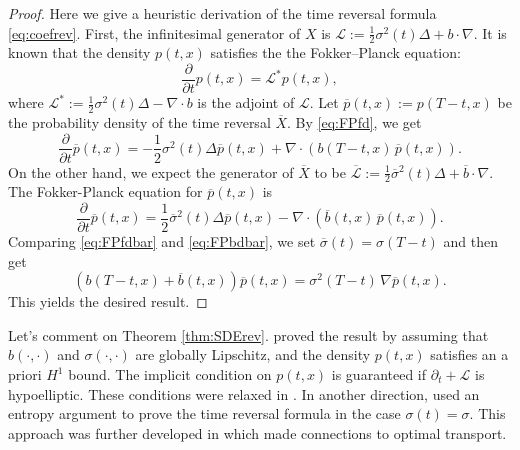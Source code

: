 \documentclass[letterpaper,11pt,reqno]{amsart}
\numberwithin{equation}{section}
\begin{document}
\begin{proof}
Here we give a heuristic derivation of the time reversal formula \eqref{eq:coefrev}.
First, the infinitesimal generator of $X$ is 
$\mathcal{L}:= \frac{1}{2} \sigma^2(t) \Delta  +b \cdot \nabla$.
It is known that the density $p(t,x)$ satisfies the the Fokker–Planck equation:
\begin{equation}
\label{eq:FPfd}
\frac{\partial}{\partial t} p(t,x) = \mathcal{L}^*p(t,x),
\end{equation}
where $\mathcal{L}^*:= \frac{1}{2} \sigma^2(t) \Delta - \nabla \cdot b$ is the adjoint of $\mathcal{L}$.
Let $\overline{p}(t,x) := p(T-t, x)$ be the probability density of the time reversal $\overline{X}$. 
By \eqref{eq:FPfd}, we get
\begin{equation}
\label{eq:FPfdbar}
\frac{\partial}{\partial t} \overline{p}(t,x) = -\frac{1}{2} \sigma^2 (t) \Delta \overline{p}(t,x)  + \nabla \cdot \left(b(T-t, x) \, \overline{p}(t,x) \right).
\end{equation}
On the other hand, we expect the generator of $\overline{X}$ to be 
$\overline{\mathcal{L}}:=  \frac{1}{2} \overline{\sigma}^2(t)  \Delta + \overline{b} \cdot \nabla$.
The Fokker-Planck equation for $\overline{p}(t,x)$ is
\begin{equation}
\label{eq:FPbdbar}
\frac{\partial}{\partial t} \overline{p}(t,x) = \frac{1}{2}  \overline{\sigma}^2(t) \Delta \overline{p}(t,x)- \nabla \cdot \left(\overline{b}(t, x) \, \overline{p}(t,x) \right).
\end{equation}
Comparing \eqref{eq:FPfdbar} and \eqref{eq:FPbdbar},
we set $\overline{\sigma}(t) = \sigma(T-t)$ and then get
\begin{equation*}
\left(b(T-t,x) + \overline{b}(t,x)\right) \overline{p}(t,x) = \sigma^2(T-t) \, \nabla \overline{p}(t,x).
\end{equation*}
This yields the desired result. 
\end{proof}

\quad Let's comment on Theorem \ref{thm:SDErev}.
\cite{HP86} proved the result by assuming that $b(\cdot, \cdot)$ and $\sigma(\cdot, \cdot)$ are globally Lipschitz, and 
the density $p(t,x)$ satisfies an a priori $H^1$ bound. 
The implicit condition on $p(t,x)$ is guaranteed if $\partial_t + \mathcal{L}$ is hypoelliptic.
These conditions were relaxed in \cite{Quastel02}. 
In another direction, \cite{Fo85, Fo86} used an entropy argument to prove the time reversal formula in the case $\sigma(t) = \sigma$. 
This approach was further developed in \cite{CCGL21} which made connections to optimal transport. 
\end{document}
